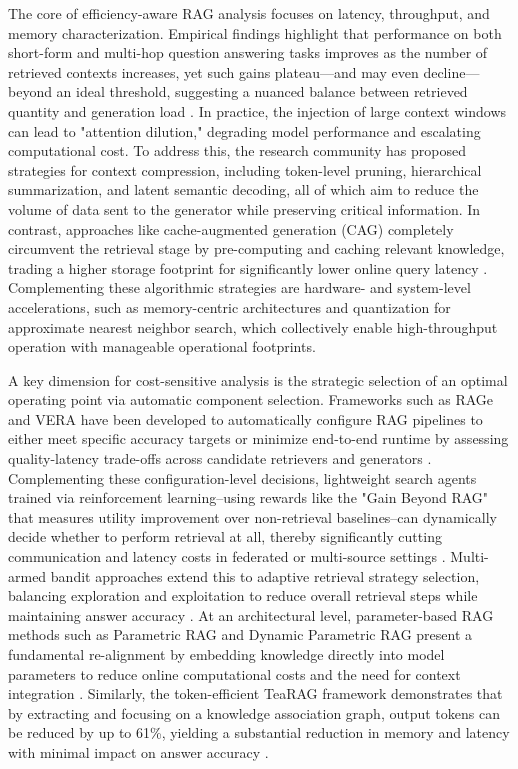 \documentclass[11pt,a4paper]{article}
\begin{document}
The core of efficiency-aware RAG analysis focuses on latency, throughput, and memory characterization. Empirical findings highlight that performance on both short-form and multi-hop question answering tasks improves as the number of retrieved contexts increases, yet such gains plateau---and may even decline---beyond an ideal threshold, suggesting a nuanced balance between retrieved quantity and generation load \cite{arxiv:2502.14759v1}. In practice, the injection of large context windows can lead to "attention dilution," degrading model performance and escalating computational cost. To address this, the research community has proposed strategies for context compression, including token-level pruning, hierarchical summarization, and latent semantic decoding, all of which aim to reduce the volume of data sent to the generator while preserving critical information. In contrast, approaches like cache-augmented generation (CAG) completely circumvent the retrieval stage by pre-computing and caching relevant knowledge, trading a higher storage footprint for significantly lower online query latency \cite{arxiv:2506.06704v1}. Complementing these algorithmic strategies are hardware- and system-level accelerations, such as memory-centric architectures and quantization for approximate nearest neighbor search, which collectively enable high-throughput operation with manageable operational footprints.

A key dimension for cost-sensitive analysis is the strategic selection of an optimal operating point via automatic component selection. Frameworks such as RAGe and VERA have been developed to automatically configure RAG pipelines to either meet specific accuracy targets or minimize end-to-end runtime by assessing quality-latency trade-offs across candidate retrievers and generators \cite{arxiv:2506.00054v1}. Complementing these configuration-level decisions, lightweight search agents trained via reinforcement learning--using rewards like the "Gain Beyond RAG" that measures utility improvement over non-retrieval baselines--can dynamically decide whether to perform retrieval at all, thereby significantly cutting communication and latency costs in federated or multi-source settings \cite{arxiv:2505.14146v2,arxiv:2502.19280v2}. Multi-armed bandit approaches extend this to adaptive retrieval strategy selection, balancing exploration and exploitation to reduce overall retrieval steps while maintaining answer accuracy \cite{arxiv:2412.01572v4}. At an architectural level, parameter-based RAG methods such as Parametric RAG and Dynamic Parametric RAG present a fundamental re-alignment by embedding knowledge directly into model parameters to reduce online computational costs and the need for context integration \cite{arxiv:2501.15915v1,arxiv:2503.23895v4}. Similarly, the token-efficient TeaRAG framework demonstrates that by extracting and focusing on a knowledge association graph, output tokens can be reduced by up to 61\%, yielding a substantial reduction in memory and latency with minimal impact on answer accuracy \cite{arxiv:2511.05385v2}.
\end{document}
